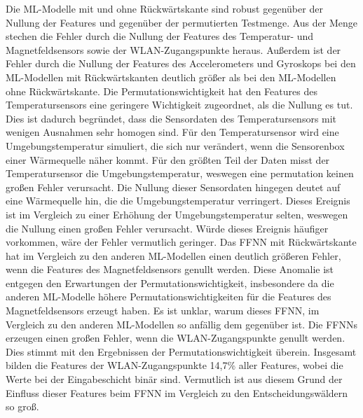 \newline
\newline
Die ML-Modelle mit und ohne Rückwärtskante sind robust gegenüber der Nullung der Features und gegenüber der permutierten Testmenge.
Aus der Menge stechen die Fehler durch die Nullung der Features des Temperatur- und Magnetfeldsensors sowie der WLAN-Zugangspunkte heraus.
Außerdem ist der Fehler durch die Nullung der Features des Accelerometers und Gyroskops bei den ML-Modellen mit Rückwärtskanten
deutlich größer als bei den ML-Modellen ohne Rückwärtskante.
\newline
\newline
Die Permutationswichtigkeit hat den Features des Temperatursensors eine geringere Wichtigkeit zugeordnet, als die Nullung es tut.
Dies ist dadurch begründet, dass die Sensordaten des Temperatursensors mit wenigen Ausnahmen sehr homogen sind.
Für den Temperatursensor wird eine Umgebungstemperatur simuliert, die sich nur verändert, wenn die Sensorenbox einer Wärmequelle näher kommt.
Für den größten Teil der Daten misst der Temperatursensor die Umgebungstemperatur, weswegen eine permutation keinen großen Fehler verursacht.
Die Nullung dieser Sensordaten hingegen deutet auf eine Wärmequelle hin, die die Umgebungstemperatur verringert.
Dieses Ereignis ist im Vergleich zu einer Erhöhung der Umgebungstemperatur selten, weswegen die Nullung einen großen Fehler verursacht.
Würde dieses Ereignis häufiger vorkommen, wäre der Fehler vermutlich geringer.
\newline
\newline
Das FFNN mit Rückwärtskante hat im Vergleich zu den anderen ML-Modellen einen deutlich größeren Fehler, wenn die Features des Magnetfeldsensors genullt werden.
Diese Anomalie ist entgegen den Erwartungen der Permutationswichtigkeit, insbesondere da die anderen ML-Modelle
höhere Permutationswichtigkeiten für die Features des Magnetfeldsensors erzeugt haben.
Es ist unklar, warum dieses FFNN, im Vergleich zu den anderen ML-Modellen so anfällig dem gegenüber ist.
\newline
\newline
Die FFNNs erzeugen einen großen Fehler, wenn die WLAN-Zugangspunkte genullt werden.
Dies stimmt mit den Ergebnissen der Permutationswichtigkeit überein.
Insgesamt bilden die Features der WLAN-Zugangspunkte 14,7\% aller Features, wobei die Werte bei der Eingabeschicht binär sind.
Vermutlich ist aus diesem Grund der Einfluss dieser Features beim FFNN im Vergleich zu den Entscheidungswäldern so groß.
\newline
